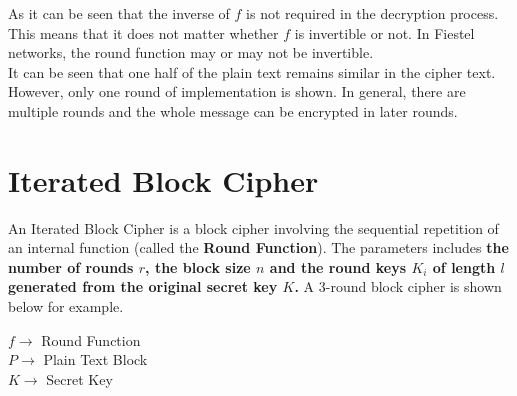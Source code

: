 \documentclass[11pt]{article}
\begin{document}
\begin{center}
\end{center}
As it can be seen that the inverse of $f$ is not required in the decryption process. This means that it does not matter whether $f$ is invertible or not. In Fiestel networks, the round function may or may not be invertible.\\
\newline
It can be seen that one half of the plain text remains similar in the cipher text. However, only one round of implementation is shown. In general, there are multiple rounds and the whole message can be encrypted in later rounds.

\section{Iterated Block Cipher}
An Iterated Block Cipher is a block cipher involving the sequential repetition of an internal function (called the \textbf{Round Function}). The parameters includes \textbf{the number of rounds $r$, the block size $n$ and the round keys $K_i$ of length $l$ generated from the original secret key $K$.} 
A 3-round block cipher is shown below for example.
\begin{center}
    $f \rightarrow$ Round Function\\
    $P \rightarrow$ Plain Text Block\\
    $K \rightarrow$ Secret Key\\
\end{center}
\end{document}
